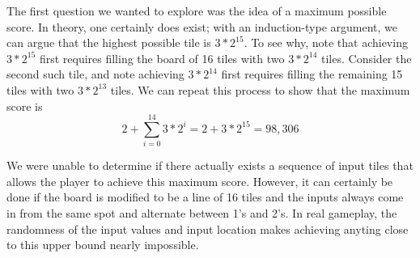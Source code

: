 \documentclass[11pt]{article}
\begin{document}
The first question we wanted to explore was the idea of a maximum possible score. In theory, one certainly does exist; with an induction-type argument, we can argue that the highest possible tile is $3*2^{15}$. To see why, note that achieving $3*2^{15}$ first requires filling the board of 16 tiles with two $3*2^{14}$ tiles. Consider the second such tile, and note achieving $3*2^{14}$ first requires filling the remaining 15 tiles with two $3*2^{13}$ tiles. We can repeat this process to show that the maximum score is
\[ 2 + \sum_{i=0}^14 3*2^{i} = 2 + 3*2^{15} = 98,306 \]

We were unable to determine if there actually exists a sequence of input tiles that allows the player to achieve this maximum score. However, it can certainly be done if the board is modified to be a line of 16 tiles and the inputs always come in from the same spot and alternate between 1's and 2's. In real gameplay, the randomness of the input values and input location makes achieving anyting close to this upper bound nearly impossible.

\begin{comment}
The question remains of whether this score is attainable. We note that this is attainable through the following process. Suppose that the tiles entered the board in the following process:\\
\begin{itemize}
\item At the beginning pieces alternate between $1$ and $2$.
\item First, pieces come in from the bottom left, and we push these to the right. 
\begin{itemize}
\item continue this until you are left with $2, 3, 6, 12$ in the bottom row.
\item we can do this with every row (with last value inserted alternating between 1 and 2), and then go down, inserting alternating 1 and 2 at the top in the first column to get 
\[ \begin{array}{cccc}
2 & & & \\
1 & & & \\
2 & & & \\
6 &12&24&48 \end{array} \]
\end{itemize}
\item We now go down until we fill in the whole board like
\[ \begin{array}{cccc} 
2 & & & \\
3 & & & \\
6 & & & \\
12&24 &48&96\end{array} \]
\item We can do a similar process in the other direction to achieve
\[ \begin{array}{cccc}
12&6 & 3& 2 \\
24& & &  \\
48& & & \\
96 & 192 & 284& 568\end{array} \]
\end{itemize}
\end{comment}
\end{document}
